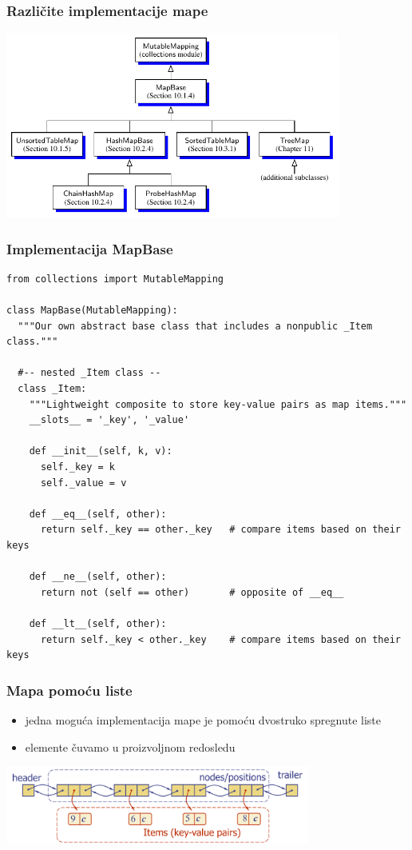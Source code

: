 \documentclass[compress]{beamer}
\begin{document}
\begin{frame}[fragile]
  \frametitle{Različite implementacije mape}
  \begin{center}
    \includegraphics[width=11cm]{asp-10-pic02.pdf}
  \end{center}
\end{frame}

\begin{frame}
  \frametitle{Implementacija MapBase}
\begin{verbatim}
from collections import MutableMapping

class MapBase(MutableMapping):
  """Our own abstract base class that includes a nonpublic _Item class."""

  #-- nested _Item class --
  class _Item:
    """Lightweight composite to store key-value pairs as map items."""
    __slots__ = '_key', '_value'

    def __init__(self, k, v):
      self._key = k
      self._value = v

    def __eq__(self, other):               
      return self._key == other._key   # compare items based on their keys

    def __ne__(self, other):
      return not (self == other)       # opposite of __eq__

    def __lt__(self, other):               
      return self._key < other._key    # compare items based on their keys
\end{verbatim}
\end{frame}

\begin{frame}[fragile]
  \frametitle{Mapa pomoću liste}
  \begin{itemize}
    \item jedna moguća implementacija mape je pomoću dvostruko spregnute liste 
    \item elemente čuvamo u proizvoljnom redosledu
  \end{itemize}
  \begin{center}
    \includegraphics[width=10cm]{asp-10-pic03.png}
  \end{center}
\end{frame}
\end{document}
